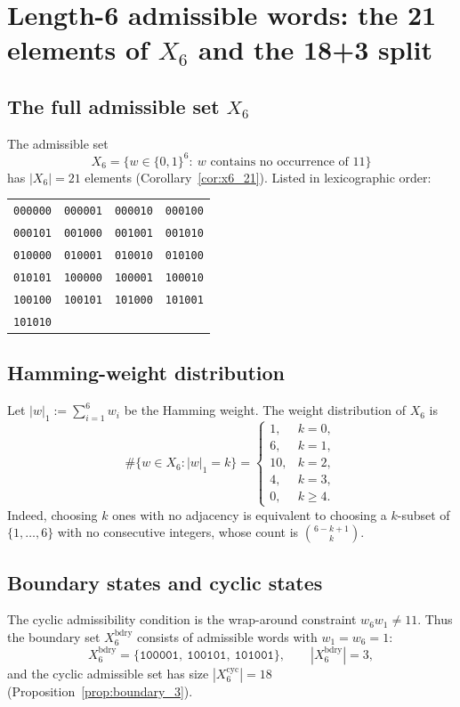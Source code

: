 
\section{Length-6 admissible words: the 21 elements of \texorpdfstring{$X_6$}{X6} and the 18+3 split}
\label{app:x6_list}

\subsection{The full admissible set \texorpdfstring{$X_6$}{X6}}
The admissible set
\[
X_6=\{w\in\{0,1\}^6:\ \text{$w$ contains no occurrence of $11$}\}
\]
has $|X_6|=21$ elements (Corollary~\ref{cor:x6_21}).
Listed in lexicographic order:

\begin{center}
\renewcommand{\arraystretch}{1.05}
\begin{tabular}{llll}
\texttt{000000} & \texttt{000001} & \texttt{000010} & \texttt{000100} \\
\texttt{000101} & \texttt{001000} & \texttt{001001} & \texttt{001010} \\
\texttt{010000} & \texttt{010001} & \texttt{010010} & \texttt{010100} \\
\texttt{010101} & \texttt{100000} & \texttt{100001} & \texttt{100010} \\
\texttt{100100} & \texttt{100101} & \texttt{101000} & \texttt{101001} \\
\texttt{101010} & & &
\end{tabular}
\end{center}

\subsection{Hamming-weight distribution}
Let $|w|_1:=\sum_{i=1}^6 w_i$ be the Hamming weight.
The weight distribution of $X_6$ is
\[
\#\{w\in X_6:|w|_1=k\}=
\begin{cases}
1, & k=0,\\
6, & k=1,\\
10, & k=2,\\
4, & k=3,\\
0, & k\ge 4.
\end{cases}
\]
Indeed, choosing $k$ ones with no adjacency is equivalent to choosing a $k$-subset of $\{1,\dots,6\}$ with no consecutive integers, whose count is $\binom{6-k+1}{k}$.

\subsection{Boundary states and cyclic states}
The cyclic admissibility condition is the wrap-around constraint $w_6w_1\neq 11$.
Thus the boundary set $X_6^{\mathrm{bdry}}$ consists of admissible words with $w_1=w_6=1$:
\[
X_6^{\mathrm{bdry}}=\{\texttt{100001},\ \texttt{100101},\ \texttt{101001}\},
\qquad |X_6^{\mathrm{bdry}}|=3,
\]
and the cyclic admissible set has size $|X_6^{\mathrm{cyc}}|=18$ (Proposition~\ref{prop:boundary_3}).

